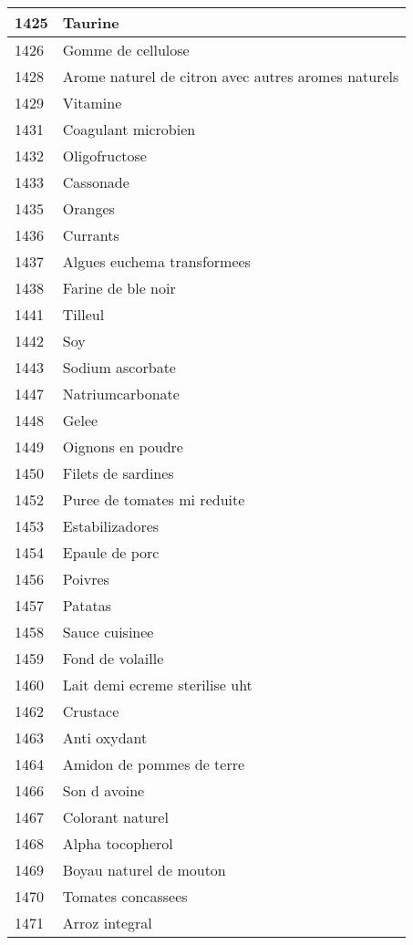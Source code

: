 \begin{longtable}{|l|l|}
1425 & Taurine \\ \hline 
1426 & Gomme de cellulose \\ \hline 
1428 & Arome naturel de citron avec autres aromes naturels \\ \hline 
1429 & Vitamine \\ \hline 
1431 & Coagulant microbien \\ \hline 
1432 & Oligofructose \\ \hline 
1433 & Cassonade \\ \hline 
1435 & Oranges \\ \hline 
1436 & Currants \\ \hline 
1437 & Algues euchema transformees \\ \hline 
1438 & Farine de ble noir \\ \hline 
1441 & Tilleul \\ \hline 
1442 & Soy \\ \hline 
1443 & Sodium ascorbate \\ \hline 
1447 & Natriumcarbonate \\ \hline 
1448 & Gelee \\ \hline 
1449 & Oignons en poudre \\ \hline 
1450 & Filets de sardines \\ \hline 
1452 & Puree de tomates mi reduite \\ \hline 
1453 & Estabilizadores \\ \hline 
1454 & Epaule de porc \\ \hline 
1456 & Poivres \\ \hline 
1457 & Patatas \\ \hline 
1458 & Sauce cuisinee \\ \hline 
1459 & Fond de volaille \\ \hline 
1460 & Lait demi ecreme sterilise uht \\ \hline 
1462 & Crustace \\ \hline 
1463 & Anti oxydant \\ \hline 
1464 & Amidon de pommes de terre \\ \hline 
1466 & Son d avoine \\ \hline 
1467 & Colorant naturel \\ \hline 
1468 & Alpha tocopherol \\ \hline 
1469 & Boyau naturel de mouton \\ \hline 
1470 & Tomates concassees \\ \hline 
1471 & Arroz integral \\ \hline 

\end{longtable}
